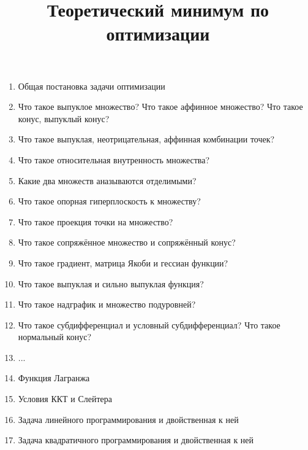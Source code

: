 \documentclass[12pt]{article}
\begin{document}
\title{Теоретический минимум по оптимизации}
\author{}
\date{}

\maketitle
\vspace{-2cm}
\begin{enumerate}
\item Общая постановка задачи оптимизации
\item Что такое выпуклое множество? Что такое аффинное множество? Что такое конус, выпуклый конус?
\item Что такое выпуклая, неотрицательная, аффинная комбинации точек?
\item Что такое относительная внутренность множества?
\item Какие два множеств аназываются отделимыми?
\item Что такое опорная гиперплоскость к множеству?
\item Что такое проекция точки на множество?
\item Что такое сопряжённое множество и сопряжённый конус?
\item Что такое градиент, матрица Якоби и гессиан функции?
\item Что такое выпуклая и сильно выпуклая функция?
\item Что такое надграфик и множество подуровней?
\item Что такое субдифференциал и условный субдифференциал? Что такое нормальный конус?
\item ...
\item Функция Лагранжа
\item Условия ККТ и Слейтера
\item Задача линейного программирования и двойственная к ней
\item Задача квадратичного программирования и двойственная к ней

\end{enumerate}
\end{document}
